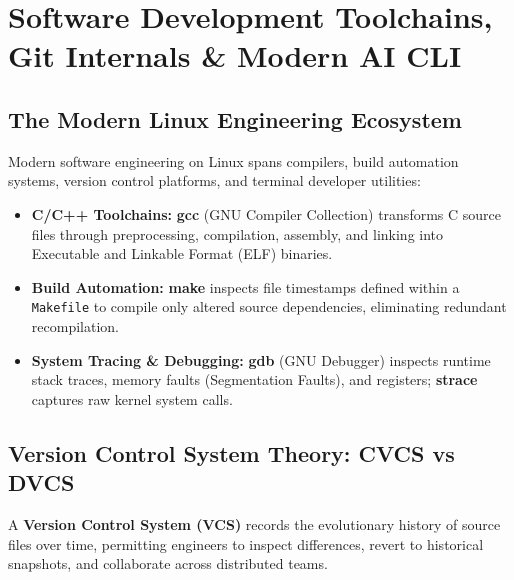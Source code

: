 \chapter{Software Development Toolchains, Git Internals \& Modern AI CLI}
\label{chap:development-tools}

\section{The Modern Linux Engineering Ecosystem}
Modern software engineering on Linux spans compilers, build automation systems, version control platforms, and terminal developer utilities:
\begin{itemize}[leftmargin=1.5em]
    \item \textbf{C/C++ Toolchains:} \textbf{gcc} (GNU Compiler Collection) transforms C source files through preprocessing, compilation, assembly, and linking into Executable and Linkable Format (ELF) binaries.
    \item \textbf{Build Automation:} \textbf{make} inspects file timestamps defined within a \texttt{Makefile} to compile only altered source dependencies, eliminating redundant recompilation.
    \item \textbf{System Tracing \& Debugging:} \textbf{gdb} (GNU Debugger) inspects runtime stack traces, memory faults (Segmentation Faults), and registers; \textbf{strace} captures raw kernel system calls.
\end{itemize}

\section{Version Control System Theory: CVCS vs DVCS}
A \textbf{Version Control System (VCS)} records the evolutionary history of source files over time, permitting engineers to inspect differences, revert to historical snapshots, and collaborate across distributed teams.

